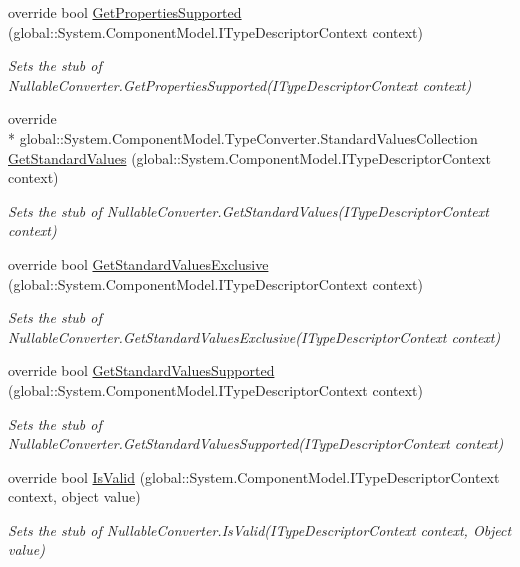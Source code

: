 \begin{DoxyCompactItemize}
override bool \hyperlink{class_system_1_1_component_model_1_1_fakes_1_1_stub_nullable_converter_aa45308313c6157b0086d79f21e140b84}{Get\-Properties\-Supported} (global\-::\-System.\-Component\-Model.\-I\-Type\-Descriptor\-Context context)
\begin{DoxyCompactList}\small\item\em Sets the stub of Nullable\-Converter.\-Get\-Properties\-Supported(\-I\-Type\-Descriptor\-Context context)\end{DoxyCompactList}\item 
override \\*
global\-::\-System.\-Component\-Model.\-Type\-Converter.\-Standard\-Values\-Collection \hyperlink{class_system_1_1_component_model_1_1_fakes_1_1_stub_nullable_converter_a2a7c986e33d8c36be1ce2e8afee47ee5}{Get\-Standard\-Values} (global\-::\-System.\-Component\-Model.\-I\-Type\-Descriptor\-Context context)
\begin{DoxyCompactList}\small\item\em Sets the stub of Nullable\-Converter.\-Get\-Standard\-Values(\-I\-Type\-Descriptor\-Context context)\end{DoxyCompactList}\item 
override bool \hyperlink{class_system_1_1_component_model_1_1_fakes_1_1_stub_nullable_converter_aa14f57647614d8a05da37faf6ceb77a4}{Get\-Standard\-Values\-Exclusive} (global\-::\-System.\-Component\-Model.\-I\-Type\-Descriptor\-Context context)
\begin{DoxyCompactList}\small\item\em Sets the stub of Nullable\-Converter.\-Get\-Standard\-Values\-Exclusive(\-I\-Type\-Descriptor\-Context context)\end{DoxyCompactList}\item 
override bool \hyperlink{class_system_1_1_component_model_1_1_fakes_1_1_stub_nullable_converter_a13930750df1774afece549ecd75792a7}{Get\-Standard\-Values\-Supported} (global\-::\-System.\-Component\-Model.\-I\-Type\-Descriptor\-Context context)
\begin{DoxyCompactList}\small\item\em Sets the stub of Nullable\-Converter.\-Get\-Standard\-Values\-Supported(\-I\-Type\-Descriptor\-Context context)\end{DoxyCompactList}\item 
override bool \hyperlink{class_system_1_1_component_model_1_1_fakes_1_1_stub_nullable_converter_a6ca7c46f14a79aa96830ce851672b278}{Is\-Valid} (global\-::\-System.\-Component\-Model.\-I\-Type\-Descriptor\-Context context, object value)
\begin{DoxyCompactList}\small\item\em Sets the stub of Nullable\-Converter.\-Is\-Valid(\-I\-Type\-Descriptor\-Context context, Object value)\end{DoxyCompactList}\end{DoxyCompactItemize}
